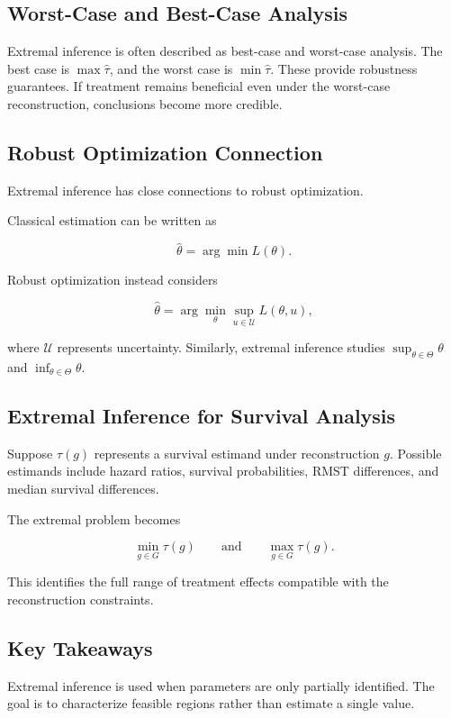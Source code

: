 \documentclass[11pt]{article}
\begin{document}
\subsection*{Worst-Case and Best-Case Analysis}

Extremal inference is often described as best-case and worst-case analysis.
The best case is $\max\hat{\tau}$, and the worst case is $\min\hat{\tau}$.
These provide robustness guarantees. If treatment remains beneficial even under the worst-case reconstruction, conclusions become more credible.

\subsection*{Robust Optimization Connection}

Extremal inference has close connections to robust optimization.

Classical estimation can be written as

\[\hat{\theta}=\arg\min L(\theta).\]

Robust optimization instead considers

\[\hat{\theta}=\arg\min_{\theta}\sup_{u\in\mathcal U}L(\theta,u),\]

where $\mathcal U$ represents uncertainty.
Similarly, extremal inference studies $\sup_{\theta\in\Theta}\theta$ and $\inf_{\theta\in\Theta}\theta$.

\subsection*{Extremal Inference for Survival Analysis}

Suppose $\tau(g)$ represents a survival estimand under reconstruction $g$.
Possible estimands include hazard ratios, survival probabilities, RMST differences, and median survival differences.

The extremal problem becomes

\[\min_{g\in G}\tau(g)\qquad\text{and}\qquad\max_{g\in G}\tau(g).\]

This identifies the full range of treatment effects compatible with the reconstruction constraints.

\subsection*{Key Takeaways}

Extremal inference is used when parameters are only partially identified. The goal is to characterize feasible regions rather than estimate a single value.
\end{document}
